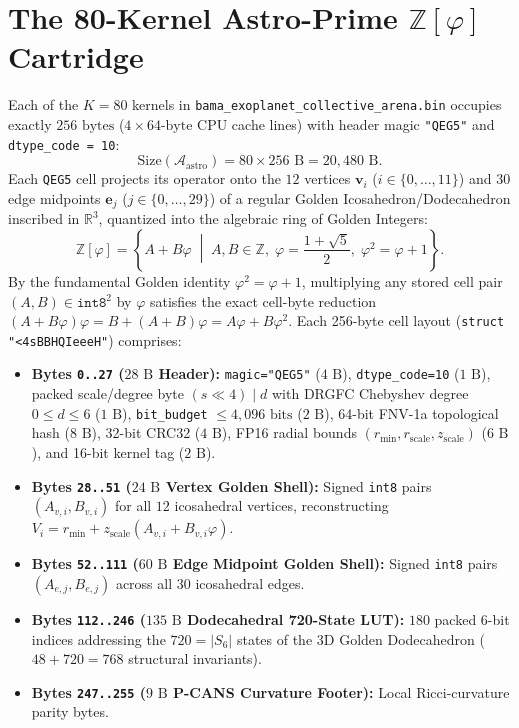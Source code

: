 \documentclass[10pt,twocolumn]{article}
\begin{document}
\section{The 80-Kernel Astro-Prime $\mathbb{Z}[\varphi]$ Cartridge}
Each of the $K = 80$ kernels in \texttt{bama\_exoplanet\_collective\_arena.bin} occupies exactly $256\text{ bytes}$ ($4 \times 64\text{-byte}$ CPU cache lines) with header magic \texttt{"QEG5"} and \texttt{dtype\_code = 10}:
\begin{equation}
  \text{Size}(\mathcal{A}_{\text{astro}}) = 80 \times 256\text{ B} = 20{,}480\text{ B}.
\end{equation}
Each \texttt{QEG5} cell projects its operator onto the $12$ vertices $\mathbf{v}_i$ ($i \in \{0,\dots,11\}$) and $30$ edge midpoints $\mathbf{e}_j$ ($j \in \{0,\dots,29\}$) of a regular Golden Icosahedron/Dodecahedron inscribed in $\mathbb{R}^3$, quantized into the algebraic ring of Golden Integers:
\begin{equation}
  \mathbb{Z}[\varphi] = \left\{ A + B\varphi \;\middle|\; A, B \in \mathbb{Z},\; \varphi = \frac{1+\sqrt{5}}{2},\; \varphi^2 = \varphi + 1 \right\}.
\end{equation}
By the fundamental Golden identity $\varphi^2 = \varphi + 1$, multiplying any stored cell pair $(A, B) \in \texttt{int8}^2$ by $\varphi$ satisfies the exact cell-byte reduction $(A + B\varphi)\varphi = B + (A+B)\varphi = A\varphi + B\varphi^2$. Each 256-byte cell layout (\texttt{struct "<4sBBHQIeeeH"}) comprises:
\begin{itemize}
  \item \textbf{Bytes \texttt{0..27} ($28\text{ B}$ Header):} \texttt{magic="QEG5"} ($4\text{ B}$), \texttt{dtype\_code=10} ($1\text{ B}$), packed scale/degree byte $(s \ll 4) \mid d$ with DRGFC Chebyshev degree $0 \le d \le 6$ ($1\text{ B}$), \texttt{bit\_budget} $\le 4{,}096\text{ bits}$ ($2\text{ B}$), 64-bit FNV-1a topological hash ($8\text{ B}$), 32-bit CRC32 ($4\text{ B}$), FP16 radial bounds $(r_{\min}, r_{\text{scale}}, z_{\text{scale}})$ ($6\text{ B}$), and 16-bit kernel tag ($2\text{ B}$).
  \item \textbf{Bytes \texttt{28..51} ($24\text{ B}$ Vertex Golden Shell):} Signed \texttt{int8} pairs $(A_{v,i}, B_{v,i})$ for all $12$ icosahedral vertices, reconstructing $V_i = r_{\min} + z_{\text{scale}}(A_{v,i} + B_{v,i}\varphi)$.
  \item \textbf{Bytes \texttt{52..111} ($60\text{ B}$ Edge Midpoint Golden Shell):} Signed \texttt{int8} pairs $(A_{e,j}, B_{e,j})$ across all $30$ icosahedral edges.
  \item \textbf{Bytes \texttt{112..246} ($135\text{ B}$ Dodecahedral 720-State LUT):} $180$ packed 6-bit indices addressing the $720 = \lvert S_6 \rvert$ states of the 3D Golden Dodecahedron ($48 + 720 = 768$ structural invariants).
  \item \textbf{Bytes \texttt{247..255} ($9\text{ B}$ P-CANS Curvature Footer):} Local Ricci-curvature parity bytes.
\end{itemize}
\end{document}
